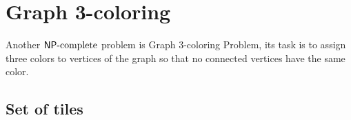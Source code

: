 \section{Graph 3-coloring}




Another $\mathsf{NP}\textnormal{-complete}$ problem is Graph 3-coloring Problem, its task is to assign three colors to vertices of the graph so that no connected vertices have the same color.



\subsection*{Set of tiles}

